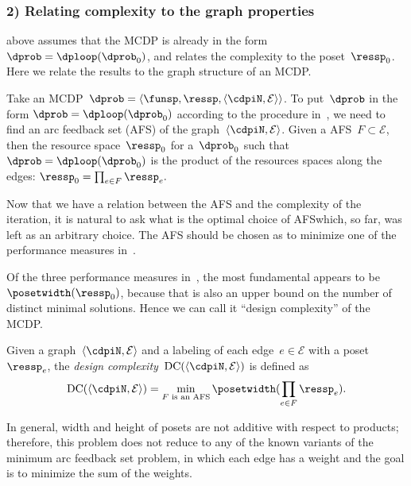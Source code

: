 \subsubsection*{2) Relating complexity to the graph properties}

 above assumes that the MCDP is already in the
form $\dprob=\dploop(\dprob_{0})$, and relates the complexity to
the poset~$\ressp_{0}$. Here we relate the results to the graph
structure of an MCDP.

Take an MCDP~$\dprob=\left\langle \funsp,\ressp,\left\langle \cdpiN,\mathcal{E}\right\rangle \right\rangle $.
To put~$\dprob$ in the form $\dprob=\dploop(\dprob_{0})$ according
to the procedure in~, we need to find an arc
feedback set (AFS) of the graph~$\left\langle \cdpiN,\mathcal{E}\right\rangle $.
Given a AFS~$F\subset\mathcal{E}$, then the resource space~$\ressp_{0}$
for a~$\dprob_{0}$ such that~$\dprob=\dploop(\dprob_{0})$ is the
product of the resources spaces along the edges: $\ressp_{0}=\prod_{e\in F}\ressp_{e}.$

Now that we have a relation between the AFS and the complexity of
the iteration, it is natural to ask what is the optimal choice of
AFS\textemdash which, so far, was left as an arbitrary choice. The
AFS should be chosen as to minimize one of the performance measures
in~. 

Of the three performance measures in~, the most
fundamental appears to be~$\posetwidth(\ressp_{0})$, because that
is also an upper bound on the number of distinct minimal solutions.
Hence we can call it ``design complexity'' of the MCDP.
\begin{defn}
\label{def:design-complexity}Given a graph~$\left\langle \cdpiN,\mathcal{E}\right\rangle $
and a labeling of each edge~$e\in\mathcal{E}$ with a poset~$\ressp_{e}$,
the \emph{design complexity~}$\text{DC}(\left\langle \cdpiN,\mathcal{E}\right\rangle )$
is defined as 
\begin{equation}
\text{DC}(\left\langle \cdpiN,\mathcal{E}\right\rangle )=\min_{F\text{ is an AFS}}\posetwidth(\prod_{e\in F}\ressp_{e}).\label{eq:complexity}
\end{equation}
\end{defn}
In general, width and height of posets are not additive with respect
to products; therefore, this problem does not reduce to any of the
known variants of the minimum arc feedback set problem, in which
each edge has a weight and the goal is to minimize the sum of the
weights.

